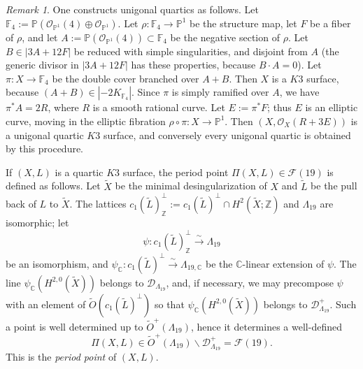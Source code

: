 \documentclass[11pt]{amsart}
\numberwithin{equation}{subsection}
\theoremstyle{plain}
\theoremstyle{remark}
\newtheorem{remark}[theorem]{Remark}
\theoremstyle{definition}
\newcommand{\CC}{{\mathbb C}}
\newcommand{\cD}{{\mathscr D}}
\newcommand{\cF}{{\mathscr F}}
\newcommand{\cO}{{\mathscr O}}
\newcommand{\FF}{{\mathbb F}}
\newcommand{\lra}{\longrightarrow}
\newcommand{\PP}{{\mathbb P}}
\newcommand{\wt}{\widetilde}
\newcommand{\ZZ}{{\mathbb Z}}
\begin{document}
%
%
 \begin{remark}\label{rmk:eccounig}
%
One constructs unigonal quartics as follows.   Let $\FF_4:=\PP(\cO_{\PP^1}(4)\oplus\cO_{\PP^1})$. Let  $\rho\colon \FF_4\to\PP^1$ be the structure map, let  $F$ be a fiber of $\rho$, and let
  $A:=\PP(\cO_{\PP^1}(4))\subset \FF_4$ be the negative section of $\rho$.  Let  $B\in|3A+12F|$ be reduced with simple singularities, and disjoint from $A$ (the generic divisor in $|3A+12F|$ has these properties, because $B\cdot A=0$). Let $\pi\colon X\to \FF_4$ be the double cover branched over $A+B$. Then $X$ is a $K3$ surface, because $(A+B)\in |-2K_{\FF_4}|$.  Since 
   $\pi$ is simply ramified over $A$, we have $\pi^{*}A=2R$, where $R$ is a smooth rational curve. Let $E:=\pi^{*}F$; thus $E$ is an elliptic curve, moving in the elliptic fibration $\rho\circ\pi\colon X\to\PP^1$. 
 Then  $(X,\cO_X(R+3E))$ is a unigonal quartic $K3$ surface, and conversely every  unigonal quartic is obtained by this procedure.  
 \end{remark}
% 
   If $(X,L)$  is a quartic $K3$ surface, the period point $\Pi(X,L)\in \cF(19)$ is defined as follows. Let $\wt{X}$ be the minimal desingularization of $X$ and $\wt{L}$ be the pull back of $L$ to $\wt{X}$. The lattices $c_1(\wt{L})^{\bot}_{\ZZ}:=c_1(\wt{L})^{\bot}\cap H^2(\wt{X};\ZZ)$ and $\Lambda_{19}$ are isomorphic; let 
%
\begin{equation}\label{primisom}
%
\psi\colon     c_1(\wt{L})^{\bot}_{\ZZ}\overset{\sim}{\lra} \Lambda_{19} 
%
\end{equation}
%
be an  isomorphism, and $\psi_{\CC}\colon     c_1(\wt{L})^{\bot}\overset{\sim}{\lra} \Lambda_{19,\CC}$ be the $\CC$-linear extension of $\psi$. The line $\psi_{\CC}(H^{2,0}(\wt{X}))$ belongs to $\cD_{\Lambda_{19}}$, and, if necessary, we may  precompose $\psi$ with an element of $\wt{O}(c_1(\wt{L})^{\bot})$ so that 
  $\psi_{\CC}(H^{2,0}(\wt{X}))$  belongs to  $\cD^{+}_{\Lambda_{19}}$. Such a point is well determined up to 
  $\wt{O}^{+}(\Lambda_{19})$, hence it determines a well-defined 
%
\begin{equation}\label{periodok3}
%
\Pi(X,L)\in \wt{O}^{+}(\Lambda_{19})\backslash\cD^{+}_{\Lambda_{19}}= \cF(19).
%
\end{equation}
%
This is the \emph{period point} of $(X,L)$. 
\end{document}
